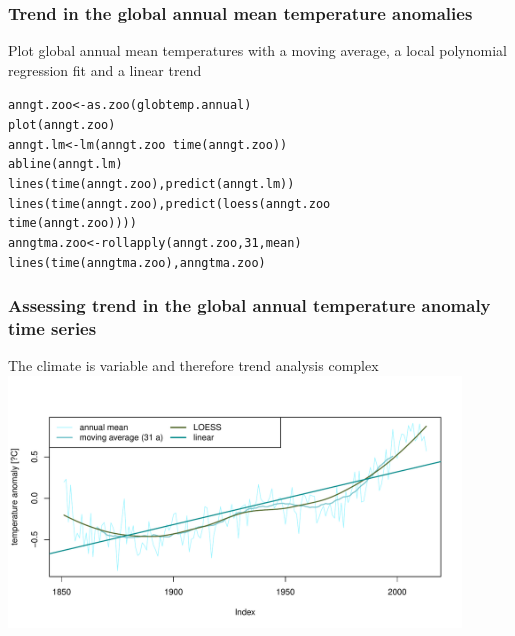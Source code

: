 \documentclass[xcolor=table, xcolor=dvipsnames]{beamer}\usepackage[]{graphicx}\usepackage[]{color}
\makeatletter
\newcommand{\hlnum}[1]{\textcolor[rgb]{0,0,0}{#1}}
\newcommand{\hlopt}[1]{\textcolor[rgb]{0,0,0}{#1}}
\newcommand{\hlstd}[1]{\textcolor[rgb]{0,0,0}{#1}}
\newcommand{\hlkwb}[1]{\textcolor[rgb]{0,0,0}{#1}}
\newcommand{\hlkwd}[1]{\textcolor[rgb]{0,0,1}{#1}}
\newenvironment{kframe}{%
 \def\at@end@of@kframe{}%
 \ifinner\ifhmode%
  \def\at@end@of@kframe{\end{minipage}}%
  \begin{minipage}{\columnwidth}%
 \fi\fi%
 \def\FrameCommand##1{\hskip\@totalleftmargin \hskip-\fboxsep
 \colorbox{shadecolor}{##1}\hskip-\fboxsep
     \hskip-\linewidth \hskip-\@totalleftmargin \hskip\columnwidth}%
 \MakeFramed {\advance\hsize-\width
   \@totalleftmargin\z@ \linewidth\hsize
   \@setminipage}}%
 {\par\unskip\endMakeFramed%
 \at@end@of@kframe}
\newenvironment{knitrout}{}{} %
\makeatother
\begin{document}
\begin{frame}[fragile]\frametitle{Trend in the global annual mean temperature anomalies}
Plot global annual mean temperatures with a moving average, a local polynomial regression fit and a linear trend
\begin{knitrout}
\color{fgcolor}\begin{kframe}
\begin{alltt}
\hlstd{anngt.zoo} \hlkwb{<-} \hlkwd{as.zoo}\hlstd{(globtemp.annual)}
\hlkwd{plot}\hlstd{(anngt.zoo)}
\hlstd{anngt.lm} \hlkwb{<-} \hlkwd{lm}\hlstd{(anngt.zoo} \hlopt{~} \hlkwd{time}\hlstd{(anngt.zoo))}
\hlkwd{abline}\hlstd{(anngt.lm)}
\hlkwd{lines}\hlstd{(}\hlkwd{time}\hlstd{(anngt.zoo),} \hlkwd{predict}\hlstd{(anngt.lm))}
\hlkwd{lines}\hlstd{(}\hlkwd{time}\hlstd{(anngt.zoo),} \hlkwd{predict}\hlstd{(}\hlkwd{loess}\hlstd{(anngt.zoo} \hlopt{~}
                                \hlkwd{time}\hlstd{(anngt.zoo))))}
\hlstd{anngtma.zoo} \hlkwb{<-} \hlkwd{rollapply}\hlstd{(anngt.zoo,}\hlnum{31}\hlstd{, mean)}
\hlkwd{lines}\hlstd{(}\hlkwd{time}\hlstd{(anngtma.zoo), anngtma.zoo)}
\end{alltt}
\end{kframe}
\end{knitrout}
\end{frame}





\begin{frame}[fragile]\frametitle{Assessing trend in the global annual temperature anomaly time series}
The climate is variable and therefore trend analysis complex
\includegraphics[width=0.9\textwidth]{./externalfig/globalannt_trend.pdf}
\end{frame}
\end{document}
